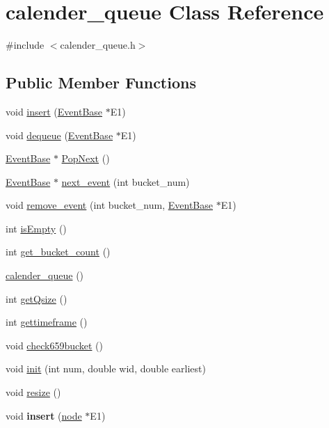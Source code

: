 \hypertarget{classcalender__queue}{\section{calender\-\_\-queue Class Reference}
\label{classcalender__queue}
}


{\ttfamily \#include $<$calender\-\_\-queue.\-h$>$}

\subsection*{Public Member Functions}
\begin{DoxyCompactItemize}
\item 
void \hyperlink{classcalender__queue_a9908e97c05434b58fca91d5327cf479b}{insert} (\hyperlink{class_event_base}{Event\-Base} $\ast$E1)
\item 
void \hyperlink{classcalender__queue_ad751210f4fe9885234857ca428799c18}{dequeue} (\hyperlink{class_event_base}{Event\-Base} $\ast$E1)
\item 
\hyperlink{class_event_base}{Event\-Base} $\ast$ \hyperlink{classcalender__queue_adce9f39aeb6b2912579ffc3aad67bd7a}{Pop\-Next} ()
\item 
\hyperlink{class_event_base}{Event\-Base} $\ast$ \hyperlink{classcalender__queue_ad23634e4153b9a76fee485f1c62e4c1a}{next\-\_\-event} (int bucket\-\_\-num)
\item 
void \hyperlink{classcalender__queue_a5643aa39133a7c8d62b465752c62ad88}{remove\-\_\-event} (int bucket\-\_\-num, \hyperlink{class_event_base}{Event\-Base} $\ast$E1)
\item 
int \hyperlink{classcalender__queue_a8d42460de7de2396f588c8f9a5aa099f}{is\-Empty} ()
\item 
int \hyperlink{classcalender__queue_a78818b6767d5f432dd4b4e629ca72435}{get\-\_\-bucket\-\_\-count} ()
\item 
\hyperlink{classcalender__queue_ae60c0a818d3de5b7e2e3e8f5e9919923}{calender\-\_\-queue} ()
\item 
int \hyperlink{classcalender__queue_ac6b4b6d42278a5c88de4550d4b7f4017}{get\-Qsize} ()
\item 
int \hyperlink{classcalender__queue_a3985b2b2d55245ec4b70e79e1588c608}{gettimeframe} ()
\item 
void \hyperlink{classcalender__queue_a3b911c0f17d0cac2ff6c2a261d123a78}{check659bucket} ()
\item 
void \hyperlink{classcalender__queue_a533aa5760d1e91277a071771c6f1ffb7}{init} (int num, double wid, double earliest)
\item 
void \hyperlink{classcalender__queue_a83feb3627a7f8b83e89227fccc4545d5}{resize} ()
\item 
\hypertarget{classcalender__queue_afabc6b9f3cade5ba8aca2856e65a1dd8}{void {\bfseries insert} (\hyperlink{classnode}{node} $\ast$E1)}\label{classcalender__queue_afabc6b9f3cade5ba8aca2856e65a1dd8}


\end{DoxyCompactItemize}
